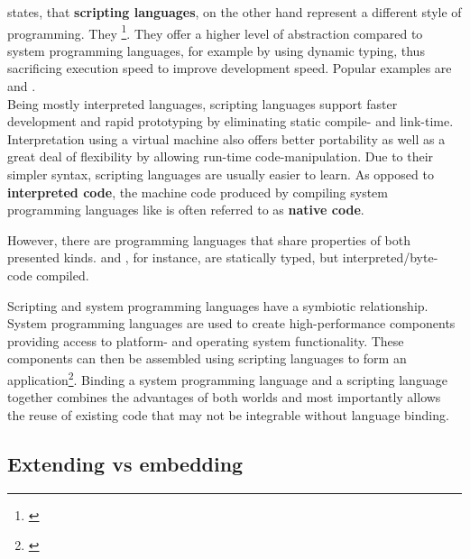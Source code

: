  states, that \textbf{scripting languages}, on the other hand represent a different style of programming. They \footnote{\citep{Ousterhout}}. They offer a higher level of abstraction compared to system programming languages, for example by using dynamic typing, thus sacrificing execution speed to improve development speed. Popular examples are  and .
\\ Being mostly interpreted languages, scripting languages support faster development and rapid prototyping by eliminating static compile- and link-time. Interpretation using a virtual machine also offers better portability as well as a great deal of flexibility by allowing run-time code-manipulation. Due to their simpler syntax, scripting languages are usually easier to learn. 
As opposed to \textbf{interpreted code}, the machine code produced by compiling system programming languages like  is often referred to as \textbf{native code}.

However, there are programming languages that share properties of both presented kinds.  and , for instance, are statically typed, but interpreted/byte-code compiled.

Scripting and system programming languages have a symbiotic relationship. System programming languages are used to create high-performance components providing access to platform- and operating system functionality. These components can then be assembled using scripting languages to form an application\footnote{\citep{Ousterhout}}. Binding a system programming language and a scripting language together combines the advantages of both worlds and most importantly allows the reuse of existing code that may not be integrable without language binding.

\subsection{Extending vs embedding}

